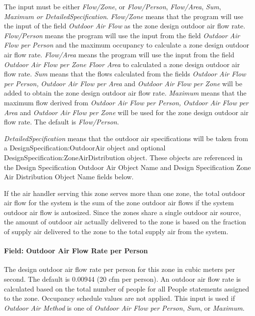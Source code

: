 The input must be either \emph{Flow/Zone}, or \emph{Flow/Person}, \emph{Flow/Area}, \emph{Sum}, \emph{Maximum or DetailedSpecification}. \emph{Flow/Zone} means that the program will use the input of the field \emph{Outdoor Air Flow} as the zone design outdoor air flow rate. \emph{Flow/Person} means the program will use the input from the field \emph{Outdoor Air Flow per Person} and the maximum occupancy to calculate a zone design outdoor air flow rate. \emph{Flow/Area} means the program will use the input from the field \emph{Outdoor Air Flow per Zone Floor Area} to calculated a zone design outdoor air flow rate. \emph{Sum} means that the flows calculated from the fields \emph{Outdoor Air Flow per Person,} \emph{Outdoor Air Flow per Area} and \emph{Outdoor Air Flow per Zone} will be added to obtain the zone design outdoor air flow rate. \emph{Maximum} means that the maximum flow derived from \emph{Outdoor Air Flow per Person,} \emph{Outdoor Air Flow per Area} and \emph{Outdoor Air Flow per Zone} will be used for the zone design outdoor air flow rate. The default is \emph{Flow/Person}.

\emph{DetailedSpecification} means that the outdoor air specifications will be taken from a DesignSpecification:OutdoorAir object and optional DesignSpecification:ZoneAirDistribution object. These objects are referenced in the Design Specification Outdoor Air Object Name and Design Specification Zone Air Distribution Object Name fields below.

If the air handler serving this zone serves more than one zone, the total outdoor air flow for the system is the sum of the zone outdoor air flows if the system outdoor air flow is autosized. Since the zones share a single outdoor air source, the amount of outdoor air actually delivered to the zone is based on the fraction of supply air delivered to the zone to the total supply air from the system.

\paragraph{Field: Outdoor Air Flow Rate per Person}\label{field-outdoor-air-flow-rate-per-person-9}

The design outdoor air flow rate per person for this zone in cubic meters per second. The default is 0.00944 (20 cfm per person). An outdoor air flow rate is calculated based on the total number of people for all People statements assigned to the zone. Occupancy schedule values are not applied. This input is used if \emph{Outdoor Air Method} is one of \emph{Outdoor Air Flow per Person}, \emph{Sum}, or \emph{Maximum}.

